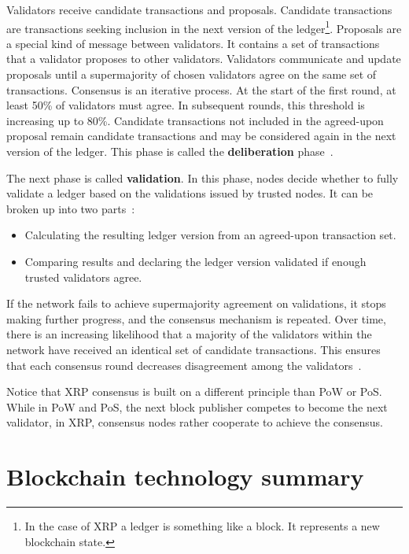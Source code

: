 Validators receive candidate transactions and proposals. Candidate transactions are transactions seeking inclusion in the next version of the ledger\footnote{In the case of XRP a ledger is something like a block. It represents a new blockchain state.}. Proposals are a special kind of message between validators. It contains a set of transactions that a validator proposes to other validators. Validators communicate and update proposals until a supermajority of chosen validators agree on the same set of transactions. Consensus is an iterative process. At the start of the first round, at least 50\% of validators must agree. In subsequent rounds, this threshold is increasing up to 80\%. Candidate transactions not included in the agreed-upon proposal remain candidate transactions and may be considered again in the next version of the ledger. This phase is called the \textbf{deliberation} phase~\cite{XRP.analysis,XRP.consensus}.

The next phase is called \textbf{validation}. In this phase, nodes decide whether to fully validate a ledger based on the validations issued by trusted nodes. It can be broken up into two parts~\cite{XRP.analysis,XRP.consensus}:
\begin{itemize}
    \item Calculating the resulting ledger version from an agreed-upon transaction set.
    \item Comparing results and declaring the ledger version validated if enough trusted validators agree.
\end{itemize}

If the network fails to achieve supermajority agreement on validations, it stops making further progress, and the consensus mechanism is repeated. Over time, there is an increasing likelihood that a majority of the validators within the network have received an identical set of candidate transactions. This ensures that each consensus round decreases disagreement among the validators~\cite{XRP.analysis,XRP.consensus}.

Notice that XRP consensus is built on a different principle than PoW or PoS. While in PoW and PoS, the next block publisher competes to become the next validator, in XRP, consensus nodes rather cooperate to achieve the consensus.


\section*{Blockchain technology summary}

